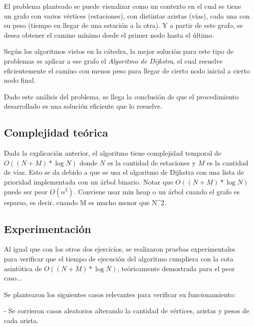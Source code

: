     \par El problema planteado se puede visualizar como un contexto en el cual se tiene un grafo con varios vértices (estaciones), con distintas aristas (vías), cada una con su peso (tiempo en llegar de una estación a la otra). Y a partir de este grafo, se desea obtener el camino mínimo desde el primer nodo hasta el último.
    \par Según los algoritmos vistos en la cátedra, la mejor solución para este tipo de problemas es aplicar a ese grafo el \emph{Algoritmo de Dijkstra}, el cual resuelve eficientemente el camino con menos peso para llegar de cierto nodo inicial a cierto nodo final.
    \par Dado este análisis del problema, se llega la conclusión de que el procedimiento desarrollado es una solución eficiente que lo resuelve.
   
    \subsection{Complejidad teórica}
        Dada la explicación anterior, el algoritmo tiene complejidad temporal de $O((N+M) * \log N)$ donde $N$ es la cantidad de estaciones y $M$ es la cantidad de vías.
        Esto se da debido a que se usa el algoritmo de Dijkstra con una lista de prioridad implementada con un árbol binario.
        Notar que $O((N+M) * \log N)$ puede ser peor $O(n^{2})$. Conviene usar min heap o un árbol cuando el grafo es esparso, es decir, cuando M es mucho menor que N^{2}.
    


    \subsection{Experimentación}

        Al igual que con los otros dos ejercicios, se realizaron pruebas experimentales para verificar que el tiempo de ejecución del algoritmo cumpliera con la cota asintótica de $O((N+M) * \log N)$, teóricamente demostrada para el peor caso...
        \par Se plantearon los siguientes casos relevantes para verificar su funcionamiento:
        \par - Se corrieron casos aleatorios alterando la cantidad de vértices, aristas y pesos de cada arista.

